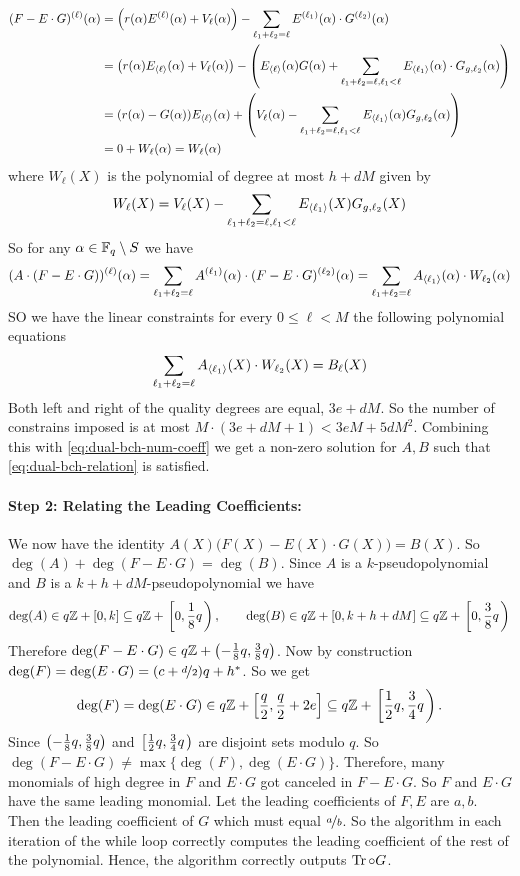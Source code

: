 \begin{align*}
  (F-E\cdot G)^{(\ell)}(\alpha) & = \left(r(\alpha)E^{(\ell)}(\alpha)+V_{\ell}(\alpha)\right)-\sum_{\ell_1+\ell_2=\ell}E^{(\ell_1)}(\alpha)\cdot G^{(\ell_2)}(\alpha)\\ 
  & = \left(r(\alpha)E_{\langle\ell\rangle}(\alpha)+V_{\ell}(\alpha)\right)-\left(E_{\langle\ell\rangle}(\alpha)G(\alpha)+\sum_{\ell_1+\ell_2=\ell, \ell_1<\ell}E_{\langle\ell_1\rangle}(\alpha)\cdot G_{g,\ell_2}(\alpha)\right)\\ 
  & = (r(\alpha)-G(\alpha))E_{\langle\ell\rangle}(\alpha)+\left(V_{\ell}(\alpha)-\sum_{\ell_1+\ell_2=\ell, \ell_1<\ell}E_{\langle\ell_1\rangle}(\alpha)G_{g,\ell_2}(\alpha)\right)\\ 
  & = 0+W_{\ell}(\alpha)=W_{\ell}(\alpha)
\end{align*}where $W_{\ell}(X)$ is the polynomial of degree at most $h+dM$ given by $$W_{\ell}(X)=V_{\ell}(X)-\sum_{\ell_1+\ell_2=\ell, \ell_1<\ell}E_{\langle\ell_1\rangle}(X)G_{g,\ell_2}(X)$$So for any $\alpha\in\mathbb{F}_q\setminus S$ we have $$(A\cdot (F-E\cdot G))^{(\ell)}(\alpha) = \sum_{\ell_1+\ell_2=\ell}A^{(\ell_1)}(\alpha)\cdot (F-E\cdot G)^{(\ell_2)}(\alpha)=\sum_{\ell_1+\ell_2=\ell}A_{\langle\ell_1\rangle}(\alpha)\cdot W_{\ell_2}(\alpha)$$SO we have the linear constraints for every $0\leq \ell<M$ the following polynomial equations $$\sum_{\ell_1+\ell_2=\ell}A_{\langle\ell_1\rangle}(X)\cdot W_{\ell_2}(X)=B_{\ell}(X)$$Both left and right of the quality degrees are equal, $3e+dM$. So the number of constrains imposed is at most $M\cdot (3e+dM+1)<3eM+5dM^2$. Combining this with \eqref{eq:dual-bch-num-coeff} we get a non-zero solution for $A,B$ such that \eqref{eq:dual-bch-relation} is satisfied. 
\paragraph*{Step 2: Relating the Leading Coefficients:} We now have the identity $A(X)\big(F(X)-E(X)\cdot G(X)\big)=B(X)$. So $\deg(A)+\deg(F-E\cdot G)=\deg (B)$. Since $A$ is a $k$-pseudopolynomial and $B$ is a $k+h+dM$-pseudopolynomial we have $$\deg(A)\in q\mathbb{Z}+[0,k]\subseteq q\mathbb{Z}+\left.\left[0,\frac18q\right.\right),\qquad \deg(B)\in q\mathbb{Z}+[0,k+h+dM]\subseteq q\mathbb{Z}+\left.\left[0,\frac38q\right.\right)$$
Therefore $\deg(F-E\cdot G)\in q\mathbb{Z}+\left(-\frac18q,\frac38q\right)$. Now by construction $\deg(F)=\deg(E\cdot G)=(c+\nicefrac{d}2)q+h^*$. So we get 
$$\deg(F)=\deg(E\cdot G)\in q\mathbb{Z}+\left[\frac{q}2,\frac{q}2+2e\right]\subseteq q\mathbb{Z}+\left.\left[\frac12q,\frac34q\right.\right).$$ 
Since  $\left(-\frac18q,\frac38q\right)$ and 
$\left.\left[\frac12q,\frac34q\right.\right)$ are disjoint sets modulo $q$. So $\deg(F-E\cdot G)\neq \max\{\deg(F),\deg(E\cdot G)\}$. 
Therefore, many monomials of high degree in $F$ and $E\cdot G$ got canceled in $F-E\cdot G$. So $F$ and $E\cdot G$ have the same leading monomial. Let the leading coefficients of $F, E$ are $a,b$. Then the leading coefficient of $G$ which must equal $\nicefrac{a}b$. So the algorithm in each iteration of the while loop correctly computes the leading coefficient of the rest of the polynomial. Hence, the algorithm correctly outputs $\operatorname{Tr}\circ G$. 

